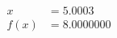 \documentclass[preview]{standalone}
\begin{document}
\begin{align*}
x &= 5.0003\\f(x) &= 8.0000000
\end{align*}
\end{document}
